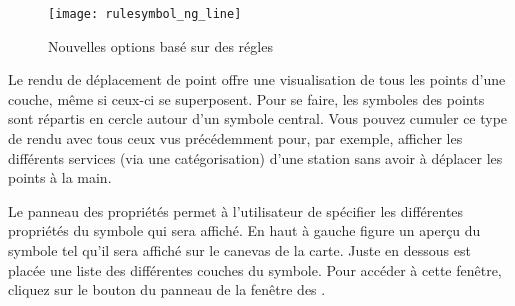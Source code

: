 \begin{figure}[ht]
   \centering
   \texttt{[image: rulesymbol\_ng\_line]}
   \caption{Nouvelles options basé sur des régles \nixcaption}\label{fig:rulesymNG}
\end{figure}


Le rendu de déplacement de point offre une visualisation de tous les points d'une couche, même si ceux-ci se superposent. Pour se faire, les symboles des points sont répartis en cercle autour d'un symbole central. Vous pouvez cumuler ce type de rendu avec tous ceux vus précédemment pour, par exemple, afficher les différents services (via une catégorisation) d'une station sans avoir à déplacer les points à la main.



Le panneau des propriétés permet à l'utilisateur de spécifier les différentes propriétés du symbole qui sera affiché. En haut à gauche figure un aperçu du symbole tel qu'il sera affiché sur le canevas de la carte. Juste en dessous est placée une liste des différentes couches du symbole. Pour accéder à cette fenêtre, cliquez sur le bouton  du panneau  de la fenêtre des .

